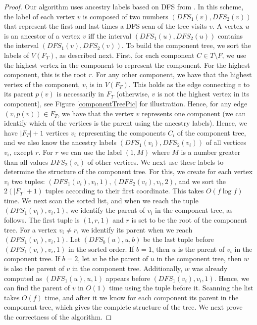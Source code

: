 \begin{proof}
Our algorithm uses ancestry labels based on DFS from \cite{kannan1992implicat}. In this scheme, the label of each vertex $v$ is composed of two numbers $(DFS_1(v),DFS_2(v))$ that represent the first and last times a DFS scan of the tree visits $v$. A vertex $u$ is an ancestor of a vertex $v$ iff the interval $(DFS_1(u),DFS_2(u))$ contains the interval $(DFS_1(v),DFS_2(v))$. To build the component tree, we sort the labels of $V(F_T)$, as described next. First, for each component $C \in T \setminus F$, we use the highest vertex in the component to represent the component. For the highest component, this is the root $r$. For any other component, we have that the highest vertex of the component, $v$, is in $V(F_T)$. This holds as the edge connecting $v$ to its parent $p(v)$ is necessarily in $F_T$ (otherwise, $v$ is not the highest vertex in its component), see Figure \ref{componentTreePic} for illustration. Hence, for any edge $(v,p(v)) \in F_T$, we have that the vertex $v$ represents one component (we can identify which of the vertices is the parent using the ancestry labels). Hence, we have $|F_T|+1$ vertices $v_i$ representing the components $C_i$ of the component tree, and we also know the ancestry labels $(DFS_1(v_i),DFS_2(v_i))$ of all vertices $v_i$, except $r$. For $r$ we can use the label $(1,M)$ where $M$ is a number greater than all values $DFS_2(v_i)$ of other vertices. We next use these labels to determine the structure of the component tree.
For this, we create for each vertex $v_i$ two tuples: $(DFS_1(v_i),v_i,1),(DFS_2(v_i),v_i,2)$, and we sort the $2(|F_T|+1)$ tuples according to their first coordinate. This takes $O(f \log{f})$ time. We next scan the sorted list, and when we reach the tuple $(DFS_1(v_i),v_i,1)$, we identify the parent of $v_i$ in the component tree, as follows. The first tuple is $(1,r,1)$ and $r$ is set to be the root of the component tree. For a vertex $v_i \neq r$, we identify its parent when we reach $(DFS_1(v_i),v_i,1)$. Let $(DFS_b(u),u,b)$ be the last tuple before $(DFS_1(v_i),v_i,1)$ in the sorted order. If $b=1$, then $u$ is the parent of $v_i$ in the component tree. If $b=2$, let $w$ be the parent of $u$ in the component tree, then $w$ is also the parent of $v$ in the component tree. Additionally, $w$ was already computed as $(DFS_1(u),u,1)$ appears before $(DFS_1(v_i),v_i,1)$. Hence, we can find the parent of $v$ in $O(1)$ time using the tuple before it. Scanning the list takes $O(f)$ time, and after it we know for each component its parent in the component tree, which gives the complete structure of the tree. We next prove the correctness of the algorithm.  


\end{proof}
